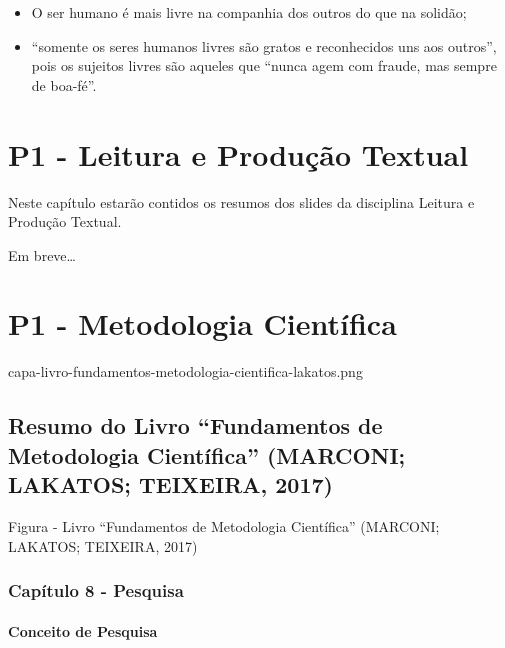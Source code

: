 \documentclass[
]{book}
\providecommand{\tightlist}{%
  \setlength{\itemsep}{0pt}\setlength{\parskip}{0pt}}
\begin{document}
\begin{itemize}
  \begin{itemize}
  \tightlist
  \item
    O ser humano é mais livre na companhia dos outros do que na solidão;
  \item
    ``somente os seres humanos livres são gratos e reconhecidos uns aos outros'', pois os sujeitos livres são aqueles que ``nunca agem com fraude, mas sempre de boa-fé''.
  \end{itemize}
\end{itemize}

\hypertarget{p1---leitura-e-produuxe7uxe3o-textual}{%
\chapter{P1 - Leitura e Produção Textual}\label{p1---leitura-e-produuxe7uxe3o-textual}}

Neste capítulo estarão contidos os resumos dos slides da disciplina Leitura e Produção Textual.

Em breve\ldots{}

\hypertarget{p1---metodologia-cientuxedfica}{%
\chapter{P1 - Metodologia Científica}\label{p1---metodologia-cientuxedfica}}

capa-livro-fundamentos-metodologia-cientifica-lakatos.png

\hypertarget{resumo-do-livro-fundamentos-de-metodologia-cientuxedfica-marconi-lakatos-teixeira-2017}{%
\section{\texorpdfstring{Resumo do Livro ``\textbf{Fundamentos de Metodologia Científica}'' (MARCONI; LAKATOS; TEIXEIRA, 2017)}{Resumo do Livro ``Fundamentos de Metodologia Científica'' (MARCONI; LAKATOS; TEIXEIRA, 2017)}}\label{resumo-do-livro-fundamentos-de-metodologia-cientuxedfica-marconi-lakatos-teixeira-2017}}

Figura - Livro ``Fundamentos de Metodologia Científica'' (MARCONI; LAKATOS; TEIXEIRA, 2017)

\hypertarget{capuxedtulo-8---pesquisa}{%
\subsection{Capítulo 8 - Pesquisa}\label{capuxedtulo-8---pesquisa}}

\hypertarget{conceito-de-pesquisa}{%
\subsubsection{Conceito de Pesquisa}\label{conceito-de-pesquisa}}
\end{document}
